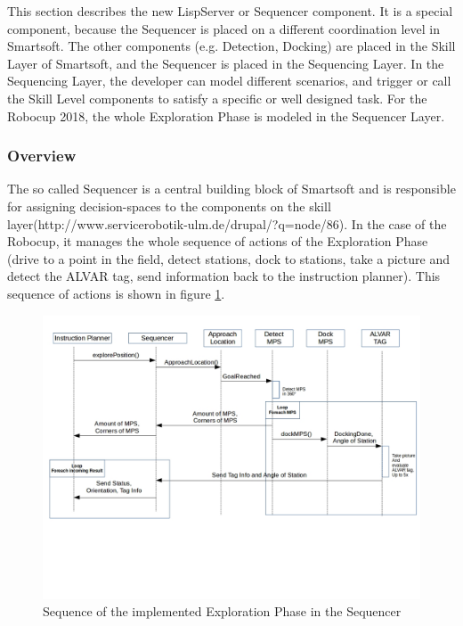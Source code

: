 This section describes the new LispServer or Sequencer component. It is a special component, because the Sequencer is placed on a different coordination level in Smartsoft. The other components (e.g. Detection, Docking) are placed in the Skill Layer of Smartsoft, and the Sequencer is placed in the Sequencing Layer. In the Sequencing Layer, the developer can model different scenarios, and trigger or call the Skill Level components to satisfy a specific or well designed task. 
For the Robocup 2018, the whole Exploration Phase is modeled in the Sequencer Layer.

\subsubsection{Overview}
\label{sec:sequencer_overview}
The so called Sequencer is a central building block of Smartsoft and is responsible for assigning decision-spaces to the components on the skill layer(http://www.servicerobotik-ulm.de/drupal/?q=node/86). In the case of the Robocup, it manages the whole sequence of actions of the Exploration Phase (drive to a point in the field, detect stations, dock to stations, take a picture and detect the ALVAR tag, send information back to the instruction planner). This sequence of actions is shown in figure \ref{fig:sequ_overview}.

\begin{figure}[h]
\centering
\includegraphics[scale=0.5]{pic/sequenceSequencer.JPG}
\caption{Sequence of the implemented Exploration Phase in the Sequencer}
\label{fig:sequ_overview}
\end{figure}

